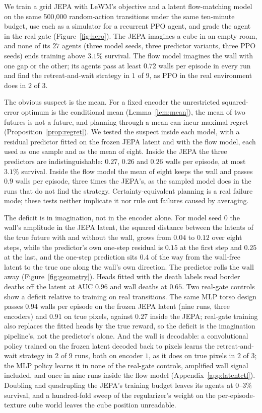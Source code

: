 We train a grid JEPA with LeWM's objective \citep{maes2026lewm} and a latent flow-matching model
\citep{lipman2023flowmatching,hafner2025dreamer4} on the same 500{,}000 random-action transitions under
the same ten-minute budget, use each as a simulator for a recurrent PPO agent, and grade the agent in the real gate (Figure~\ref{fig:hero}). The JEPA imagines a cube in an empty room, and none of its $27$ agents (three model seeds, three predictor variants, three PPO seeds) ends training above $3.1\%$ survival. The flow model imagines the wall with one gap or the other; its agents pass at least $0.72$ walls per episode in every run and find the retreat-and-wait strategy in $1$ of $9$, as PPO in the real environment does in $2$ of $3$.

The obvious suspect is the mean. For a fixed encoder the unrestricted squared-error optimum is the conditional mean (Lemma~\ref{lem:mean}), the mean of two futures is not a future, and planning through a mean can incur
maximal regret (Proposition~\ref{prop:regret}). We tested the suspect inside each model, with a residual predictor fitted on the frozen JEPA latent and with the flow model, each used as one sample and as the mean of eight. Inside the JEPA the three predictors are indistinguishable: $0.27$, $0.26$ and $0.26$ walls per episode, at most $3.1\%$ survival. Inside the flow model the mean of eight keeps the wall and passes $0.9$ walls per
episode, three times the JEPA's, as the sampled model does in the runs that do not find the strategy.
Certainty-equivalent planning is a real failure mode; these tests neither implicate it nor rule out failures caused by averaging.

The deficit is in imagination, not in the encoder alone. For model seed $0$ the wall's amplitude in the JEPA latent, the squared distance between the latents of the true future with and without the wall, grows from $0.04$ to $0.12$ over
eight steps, while the predictor's own one-step residual is $0.15$ at the first step and $0.25$ at the
last, and the one-step prediction sits $0.4$ of the way from the wall-free latent to the true one along
the wall's own direction. The predictor rolls the wall away (Figure~\ref{fig:geometry}). Heads fitted
with the death labels read border deaths off the latent at AUC $0.96$ and wall deaths at $0.65$. Two real-gate controls show a deficit relative to training on real transitions. The same MLP torso design passes $0.94$ walls per episode on the frozen JEPA latent (nine runs, three encoders) and $0.91$ on true pixels, against $0.27$ inside the JEPA; real-gate training also replaces the fitted heads by the true reward, so the deficit is the imagination pipeline's, not the predictor's alone. And the wall is decodable: a convolutional policy trained on the frozen latent decoded back to pixels learns the retreat-and-wait strategy in $2$ of $9$ runs, both on encoder $1$, as it does on true pixels in $2$ of $3$; the MLP policy learns it in none of the real-gate controls, amplified wall signal included, and once in nine runs inside the flow model (Appendix~\ref{app:latentctl}). Doubling and quadrupling the JEPA's training budget leaves its agents at $0$--$3\%$ survival, and a
hundred-fold sweep of the regularizer's weight on the per-episode-texture cube world leaves the cube
position unreadable.

